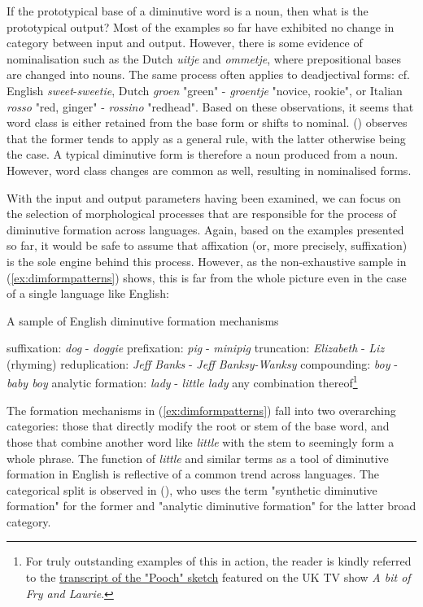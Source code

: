 If the prototypical base of a diminutive word is a noun, then what is the prototypical output? Most of the examples so far have exhibited no change in category between input and output. However, there is some evidence of nominalisation such as the Dutch \textit{uitje} and \textit{ommetje}, where prepositional bases are changed into nouns. The same process often applies to deadjectival forms: cf. English \textit{sweet}-\textit{sweetie}, Dutch \textit{groen} "green" - \textit{groentje} "novice, rookie", or Italian \textit{rosso} "red, ginger" - \textit{rossino} "redhead". Based on these observations, it seems that word class is either retained from the base form or shifts to nominal. \citeauthor{Schneider+2003} (\citeyear{Schneider+2003}) observes that the former tends to apply as a general rule, with the latter otherwise being the case. A typical diminutive form is therefore a noun produced from a noun. However, word class changes are common as well, resulting in nominalised forms.

With the input and output parameters having been examined, we can focus on the selection of morphological processes that are responsible for the process of diminutive formation across languages. Again, based on the examples presented so far, it would be safe to assume that affixation (or, more precisely, suffixation) is the sole engine behind this process. However, as the non-exhaustive sample in (\ref{ex:dimformpatterns}) shows, this is far from the whole picture even in the case of a single language like English:

\begin{exe}
\ex \label{ex:dimformpatterns}
A sample of English diminutive formation mechanisms 
\begin{xlist}
    \ex suffixation: \textit{dog} - \textit{doggie}
    \ex prefixation: \textit{pig} - \textit{minipig}
    \ex truncation: \textit{Elizabeth} - \textit{Liz}
    \ex (rhyming) reduplication: \textit{Jeff Banks} - \textit{Jeff Banksy-Wanksy}
    \ex compounding: \textit{boy} - \textit{baby boy}
    \ex analytic formation: \textit{lady} - \textit{little lady}
    \ex any combination thereof\footnote{For truly outstanding examples of this in action, the reader is kindly referred to the \href{https://abitoffryandlaurie.co.uk/sketches/pooch}{transcript of the "Pooch" sketch} featured on the UK TV show \textit{A bit of Fry and Laurie}.}
\end{xlist}
\end{exe}

The formation mechanisms in (\ref{ex:dimformpatterns}) fall into two overarching categories: those that directly modify the root or stem of the base word, and those that combine another word like \textit{little} with the stem to seemingly form a whole phrase. The function of \textit{little} and similar terms as a tool of diminutive formation in English is reflective of a common trend across languages. The categorical split is observed in \citeauthor{Schneider+2003} (\citeyear{Schneider+2003}), who uses the term "synthetic diminutive formation" for the former and "analytic diminutive formation" for the latter broad category. 

